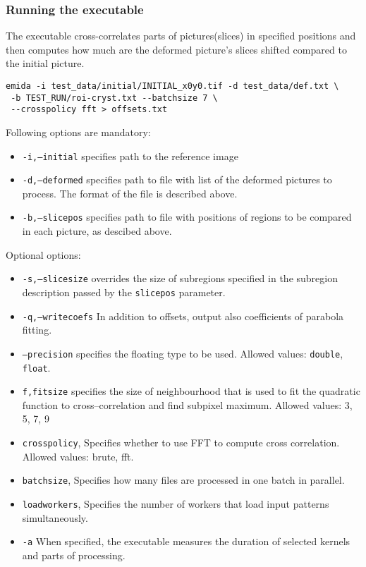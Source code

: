 \subsubsection*{Running the executable}
The executable cross-correlates parts of pictures(slices) in specified positions and then computes how much are the deformed picture's slices shifted compared to the initial picture.
\begin{verbatim}
emida -i test_data/initial/INITIAL_x0y0.tif -d test_data/def.txt \
 -b TEST_RUN/roi-cryst.txt --batchsize 7 \
 --crosspolicy fft > offsets.txt
\end{verbatim}
Following options are mandatory:
\begin{itemize}
	\item \texttt{-i,--initial} specifies path to the reference image
	\item \texttt{-d,--deformed} specifies path to file with list of the deformed pictures to process. The format of the file is described above.
	\item \texttt{-b,--slicepos} specifies path to file with positions of regions to be compared in each picture, as descibed above.
\end{itemize}
Optional options:
\begin{itemize}
	\item \texttt{-s,--slicesize} overrides the size of subregions specified in the subregion description passed by the \texttt{slicepos} parameter.
	\item \texttt{-q,--writecoefs} In addition to offsets, output also coefficients of parabola fitting.
	\item  \texttt{--precision} specifies the floating type to be used. Allowed values: \texttt{double}, \texttt{float}.
	\item \texttt{f,fitsize} specifies the size of neighbourhood that is used to fit the quadratic function to cross--correlation and find subpixel maximum. Allowed values: 3, 5, 7, 9
	\item \texttt{crosspolicy}, Specifies whether to use FFT to compute cross correlation. Allowed values: brute, fft.
	\item \texttt{batchsize}, Specifies how many files are processed in one batch in parallel.
	\item \texttt{loadworkers}, Specifies the number of workers that load input patterns simultaneously.
	\item \texttt{-a} When specified, the executable measures the duration of selected kernels and parts of processing.
\end{itemize}


